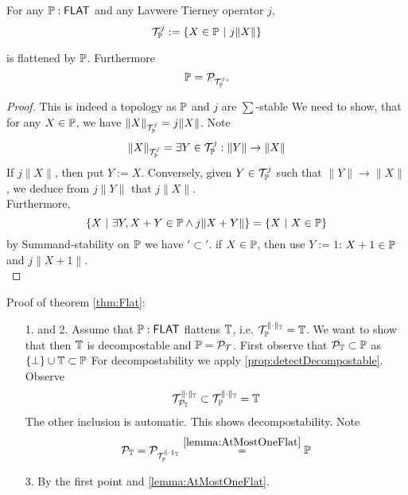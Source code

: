 %
\begin{lemma}{\label{lemma:AtMostOneFlat}}
		For any $\mathbb{P} : \mathsf{FLAT}$ and any Lavwere Tierney operator $j$,
	\[\mathcal{T}^j_{\mathbb{P}} := \{ X \in \mathbb{P} \ | \ j \|X \| \}	 \]
	
	is flattened by $\mathbb{P}$. Furthermore
	\[\mathbb{P}  = \mathcal{P}_{\mathcal{T}^{j}_{\mathbb{P}}}.\]
\end{lemma}
\begin{proof}

				This is indeed a topology as $\mathbb{P}$ and $j$ are $\sum$-stable %
			We need to show, that for any $X \in \mathbb{P}$, we have $\|X\|_{\mathcal{T}^j_{\mathbb{P}}} = j\|X\|$.
			Note
			\[
			\|X\|_{\mathcal{T}^j_{\mathbb{P}}} = \exists Y \in \mathcal{T}^j_{\mathbb{P}} : \|Y\| \to \|X\|
			\]
			If $j\|X\|$, then put $Y := X$. Conversely, given $Y \in \mathcal{T}^j_{\mathbb{P}}$ such that $\|Y\| \to \|X\|$, we deduce from $j \|Y\|$ that $j\|X\|$. \\
			Furthermore,
		\[
	\{X \ | \ \exists Y , X + Y \in \mathbb{P} \land j \|X + Y\| \} = \{X \ | \ X \in \mathbb{P}\}
	\]
	by Summand-stability on $\mathbb{P}$ we have $'\subset'$.
	if $X \in \mathbb{P}$, then use $Y:=1$: $X + 1 \in \mathbb{P}$ and $j \| X + 1\|$. \\
\end{proof}
Proof of theorem \ref{thm:Flat}:
\begin{enumerate}
	\item [1. and 2.] 	Assume that $\mathbb{P} : \mathsf{FLAT}$ flattens $\mathbb{T}$, i.e. $\mathcal{T}_{\mathbb{P}}^{\|\cdot\|_{\mathbb{T}}}  = \mathbb{T}$. We want to show that then $\mathbb{T}$ is decompostable and $\mathbb{P}= \mathcal{P}_{\mathcal{T}}$. 
	First observe that $\mathcal{P}_{\mathbb{T}} \subset \mathbb{P}$ as $\{\bot\} \cup \mathbb{T} \subset \mathbb{P}$ %
	For decompostability we apply \ref{prop:detectDecompostable}.
	Observe
	\[\mathcal{T}_{\mathcal{P}_{\mathbb{T}}}^{\|\cdot\|_{\mathbb{T}}} \subset \mathcal{T}_{\mathbb{P}}^{\|\cdot\|_{\mathbb{T}}} = \mathbb{T} \]
	The other inclusion is automatic. This shows decompostability.
	Note
	\[
	\mathcal{P}_{\mathbb{T}} = \mathcal{P}_{\mathcal{T}_{\mathbb{P}}^{\|\cdot\|_{\mathbb{T}}}} \overset{\ref{lemma:AtMostOneFlat}}{=} \mathbb{P}
	\]
	\item [3.] By the first point and \ref{lemma:AtMostOneFlat}.
\end{enumerate}
